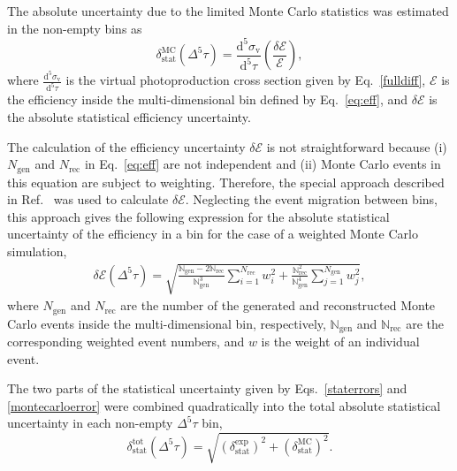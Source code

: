 \documentclass[prc,twocolumn,superscriptaddress,showpacs,amssymb,amsmath,amsfonts,aps,nofootinbib]{revtex4-1}
\begin{document}
The absolute uncertainty due to the limited Monte Carlo statistics was estimated in the non-empty bins as 
\begin{equation}
\delta_{\text{stat}}^{\text{MC}}(\Delta^{5} \tau) = \frac{\textrm{d}^{5}\sigma_{\text{v}}}{\textrm{d}^{5}\tau} \left( \frac{\delta \mathcal{E}}{\mathcal{E}} \right),
\label{montecarloerror}
\end{equation}
where $\frac{\textrm{d}^{5}\sigma_{\text{v}}}{\textrm{d}^{5}\tau}$ is the virtual photoproduction cross section given by Eq.\!~\eqref{fulldiff}, $\mathcal{E}$ is the efficiency inside the multi-dimensional bin defined by Eq.\!~\eqref{eq:eff}, and $\delta \mathcal{E}$ is the absolute statistical efficiency uncertainty. 


The calculation of the efficiency uncertainty $\delta \mathcal{E}$ is not straightforward because (i) $N_{\text{gen}}$ and $N_{\text{rec}}$ in Eq.\!~\eqref{eq:eff} are not independent and (ii) Monte Carlo events in this equation are subject to weighting. Therefore, the special approach described in Ref.\!~\cite{Laforge:1996ts} was used to calculate $\delta \mathcal{E}$. Neglecting the event migration between bins, this approach gives the following expression for the absolute statistical uncertainty of the efficiency in a bin for the case of a weighted Monte Carlo simulation,
\begin{equation}
\begin{aligned}
\delta \mathcal{E}(\Delta^{5} \tau) = \sqrt{\frac{\mathbb{N}_{\text{gen}} - 2\mathbb{N}_{\text{rec}}}{\mathbb{N}_{\text{gen}}^{3}}\sum\limits_{i=1}^{N_{\text{rec}}} w_{i}^{2} + \frac{\mathbb{N}_{\text{rec}}^{2}}{\mathbb{N}_{\text{gen}}^{4}}\sum\limits_{j=1}^{N_{\text{gen}}} w_{j}^{2}},
\end{aligned}
\label{eq:eff_err_weighted}
\end{equation}
where $N_{\text{gen}}$ and $N_{\text{rec}}$ are the number of the generated and reconstructed Monte Carlo events inside the multi-dimensional bin, respectively, $\mathbb{N}_{\text{gen}}$ and  $\mathbb{N}_{\text{rec}}$ are the corresponding weighted event numbers, and $w$ is the weight of an individual event.


The two parts of the statistical uncertainty given by Eqs.\!~\eqref{staterrors} and \eqref{montecarloerror} were combined quadratically into the total absolute statistical uncertainty in each non-empty $\Delta^{5} \tau$ bin,
\begin{equation}
\delta_{\text{stat}}^{\text{tot}}(\Delta^{5} \tau) =
\sqrt{\left (\delta_{\text{stat}}^{\text{exp}} \right )^{2} + \left (\delta_{\text{stat}}^{\text{MC}}\right )^{2}}.
\label{errortot}
\end{equation}
\end{document}
